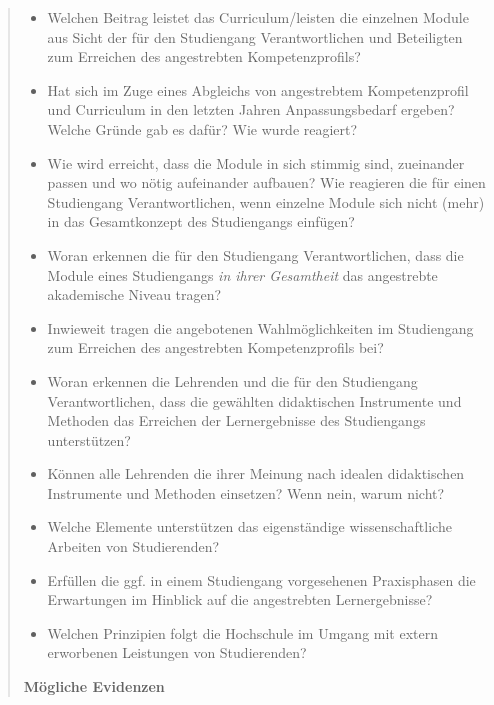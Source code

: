 \begin{quote}
\begin{itemize}
\item
  Welchen Beitrag leistet das Curriculum/leisten die einzelnen Module
  aus Sicht der für den Studiengang Verantwortlichen und Beteiligten zum
  Erreichen des angestrebten Kompetenzprofils?
\item
  Hat sich im Zuge eines Abgleichs von angestrebtem Kompetenzprofil und
  Curriculum in den letzten Jahren Anpassungsbedarf ergeben? Welche
  Gründe gab es dafür? Wie wurde reagiert?
\item
  Wie wird erreicht, dass die Module in sich stimmig sind, zueinander
  passen und wo nötig aufeinander aufbauen? Wie reagieren die für einen
  Studiengang Verantwortlichen, wenn einzelne Module sich nicht (mehr)
  in das Gesamtkonzept des Studiengangs einfügen?
\item
  Woran erkennen die für den Studiengang Verantwortlichen, dass die
  Module eines Studiengangs \emph{in ihrer Gesamtheit} das angestrebte
  akademische Niveau tragen?
\item
  Inwieweit tragen die angebotenen Wahlmöglichkeiten im Studiengang zum
  Erreichen des angestrebten Kompetenzprofils bei?
\item
  Woran erkennen die Lehrenden und die für den Studiengang
  Verantwortlichen, dass die gewählten didaktischen Instrumente und
  Methoden das Erreichen der Lernergebnisse des Studiengangs
  unterstützen?
\item
  Können alle Lehrenden die ihrer Meinung nach idealen didaktischen
  Instrumente und Methoden einsetzen? Wenn nein, warum nicht?
\item
  Welche Elemente unterstützen das eigenständige wissenschaftliche
  Arbeiten von Studierenden?
\item
  Erfüllen die ggf. in einem Studiengang vorgesehenen Praxisphasen die
  Erwartungen im Hinblick auf die angestrebten Lernergebnisse?
\item
  Welchen Prinzipien folgt die Hochschule im Umgang mit extern
  erworbenen Leistungen von Studierenden?
\end{itemize}

\textbf{Mögliche Evidenzen}


\end{quote}

